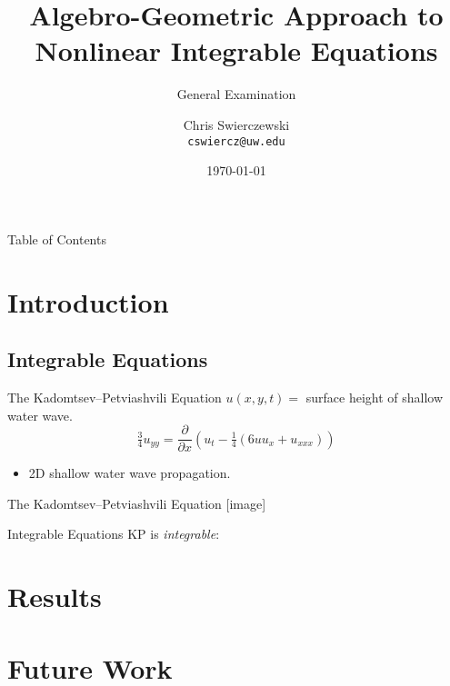 \documentclass {beamer}
\title{Algebro-Geometric Approach to Nonlinear Integrable Equations}
\subtitle{General Examination}
\author{
  Chris Swierczewski\\
  {\tt cswiercz@uw.edu}
}
\date{\today}
\institute{
  Department of Applied Mathematics\\
  University of Washington\\
  Seattle, Washington

}
\begin{document}

\begin{frame}
  \titlepage
\end{frame}

\begin{frame}{Table of Contents}{}
  \tableofcontents
\end{frame}

\section{Introduction}

\subsection{Integrable Equations}

\begin{frame}{The Kadomtsev--Petviashvili Equation}{}
  $u(x,y,t) = $ surface height of shallow water wave.
  \[
  \tfrac{3}{4} u_{yy} = \frac{\partial}{\partial x} \left(
  u_t - \tfrac{1}{4} \left(6uu_x + u_{xxx}\right) \right)
  \]
  \begin{itemize}
    \item 2D shallow water wave propagation.
  \end{itemize}
\end{frame}

\begin{frame}{The Kadomtsev--Petviashvili Equation}{}
  [image]
\end{frame}


\begin{frame}{Integrable Equations}{}
  KP is {\it integrable}:
\end{frame}

\section{Results}



\section{Future Work}
\end{document}
